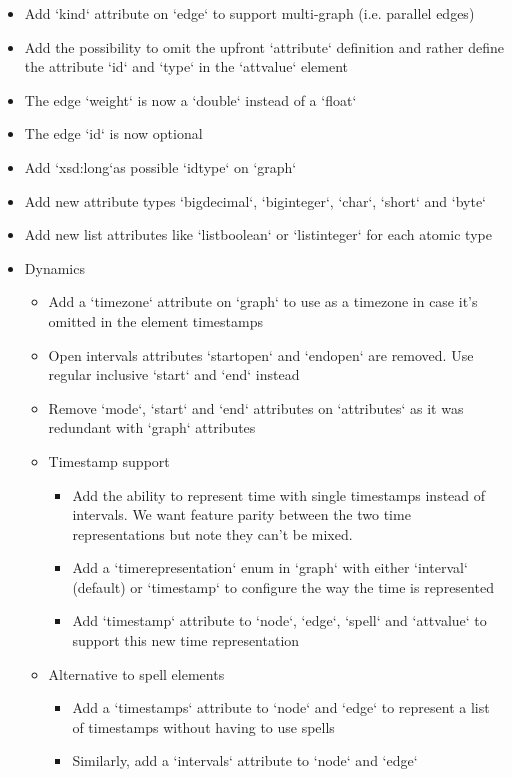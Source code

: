 \documentclass[a4paper,10pt]{article}
\begin{document}
\begin{itemize}
\item Add `kind` attribute on `edge` to support multi-graph (i.e. parallel edges)
\item Add the possibility to omit the upfront `\<attribute`\> definition and rather define the attribute `id` and `type` in the `\<attvalue\>` element
\item The edge `weight` is now a `double` instead of a `float`
\item The edge `id` is now optional
\item Add `xsd:long`as possible `idtype` on `\<graph\>`
\item Add new attribute types `bigdecimal`, `biginteger`, `char`, `short` and `byte`
\item Add new list attributes like `listboolean` or `listinteger` for each atomic type
\item Dynamics
\begin{itemize}
\item Add a `timezone` attribute on `\<graph\>` to use as a timezone in case it's omitted in the element timestamps
\item Open intervals attributes `startopen` and `endopen` are removed. Use regular inclusive `start` and `end` instead
\item Remove `mode`, `start` and `end` attributes on `\<attributes\>` as it was redundant with `\<graph\>` attributes
\item Timestamp support
\begin{itemize}
\item Add the ability to represent time with single timestamps instead of intervals. We want feature parity between the two time representations but note they can't be mixed.
\item Add a `timerepresentation` enum in `\<graph\>` with either `interval` (default) or `timestamp` to configure the way the time is represented
\item Add `timestamp` attribute to `\<node\>`, `\<edge\>`, `\<spell\>` and `\<attvalue\>` to support this new time representation
\end{itemize}
\item Alternative to spell elements
\begin{itemize}
\item Add a `timestamps` attribute to `\<node\>` and `\<edge\>` to represent a list of timestamps without having to use spells
\item Similarly, add a `intervals` attribute to `\<node\>` and `\<edge\>`

\end{itemize}
\end{itemize}
\end{itemize}
\end{document}
